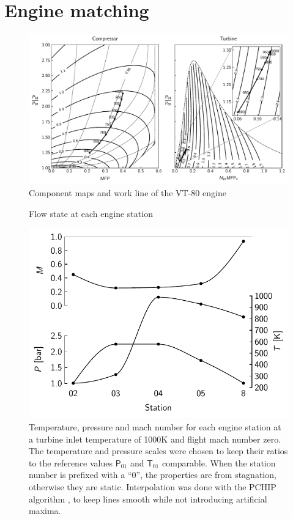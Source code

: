 \documentclass[tcc]{subfiles}
\begin{document}
\section{Engine matching}
\begin{figure}
    \AddThispageHook{\thispagestyle{empty}}
    \caption{Component maps and work line of the VT-80 engine}
\includegraphics{fig/wline.pdf}
\end{figure}

\begin{figure}
    \centering
    \caption{Flow state at each engine station}
    \includegraphics{fig/stations1000K}
    \caption*{Temperature, pressure and mach number for each engine station at a turbine inlet temperature of 1000K and flight mach number zero. The temperature and pressure scales were chosen to keep their ratios to the reference values $\mathsf P_{01}$ and $\mathsf T_{01}$ comparable. When the station number is prefixed with a ``0'', the properties are from stagnation, otherwise they are static. Interpolation was done with the PCHIP algorithm \cite{Fritsch1980, Moler2004}, to keep lines smooth while not introducing artificial maxima.}
\end{figure}
\end{document}
